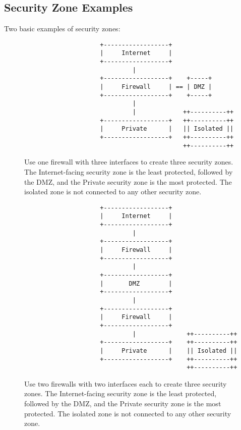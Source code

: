 \label{subsec:"Security Zone Examples"}\subsection{Security Zone Examples}
Two basic examples of security zones:
\begin{center}
\begin{figure}[ht]
\begin{verbatim}
                     +------------------+
                     |     Internet     |
                     +------------------+
                              |
                     +------------------+    +-----+
                     |     Firewall     | == | DMZ |
                     +------------------+    +-----+
                              |
                              |             ++----------++
                     +------------------+   ++----------++
                     |     Private      |   || Isolated ||
                     +------------------+   ++----------++
                                            ++----------++
\end{verbatim}
\caption{Use one firewall with three interfaces to create three security zones. The Internet-facing security zone is the least protected, followed by the DMZ, and the Private security zone is the most protected. The isolated zone is not connected to any other security zone.}
\end{figure}
\end{center}
\clearpage
\begin{center}
\begin{figure}[ht]
\begin{verbatim}
                     +------------------+
                     |     Internet     |
                     +------------------+
                              |
                     +------------------+
                     |     Firewall     |
                     +------------------+
                              |
                     +------------------+
                     |       DMZ        |
                     +------------------+ 
                              |
                     +------------------+
                     |     Firewall     |
                     +------------------+
                              |              ++----------++
                     +------------------+    ++----------++
                     |     Private      |    || Isolated ||
                     +------------------+    ++----------++
                                             ++----------++ 
\end{verbatim}
\caption{Use two firewalls with two interfaces each to create three security zones. The Internet-facing security zone is the least protected, followed by the DMZ, and the Private security zone is the most protected. The isolated zone is not connected to any other security zone.}
\end{figure}
\end{center}
